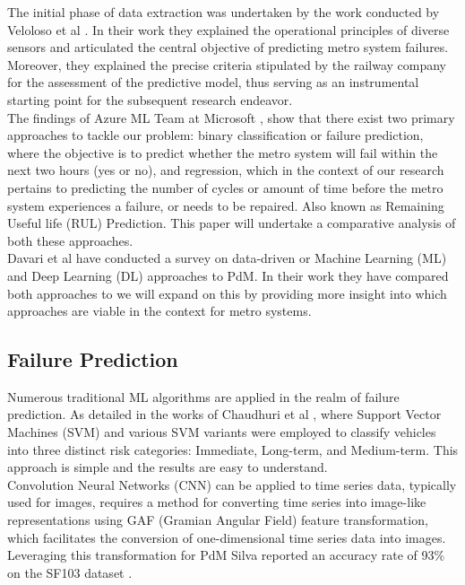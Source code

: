 \documentclass{article}
\begin{document}
The initial phase of data extraction was
undertaken by the work conducted by Veloloso et al \cite{Veloso2022}. In their work they explained the operational principles of diverse sensors
and articulated the central objective of predicting metro system failures. 
Moreover, they explained the precise criteria stipulated by the railway company for the assessment of the predictive model, thus serving as an instrumental starting point for the subsequent research endeavor. \\

The findings of Azure ML Team at Microsoft \cite{AzureML2015}, show that there exist two primary approaches to tackle our problem: binary classification or failure prediction, where the objective is to predict whether the metro system will fail within the next two hours (yes or no), and regression, which in the context of our research pertains to predicting the number of cycles or amount of time before the metro system experiences a failure, or needs to be repaired. Also known as Remaining Useful life (RUL) Prediction. This paper will undertake a comparative analysis of both these approaches. \\

Davari et al \cite{Davari2021} have conducted a survey on data-driven or Machine Learning (ML) and Deep Learning (DL) approaches to PdM. In their work they have compared both approaches to we will expand on this by providing more insight into which approaches are viable in the context for metro systems.

\subsection{Failure Prediction}

Numerous traditional ML algorithms are applied in the realm of failure prediction. As detailed in the works of Chaudhuri et al \cite{chaudhuri2018}, where Support Vector Machines (SVM) and various SVM variants were employed to classify vehicles into three distinct risk categories: Immediate, Long-term, and Medium-term. This approach is simple and the results are easy to understand. \\

Convolution Neural Networks (CNN) can be applied to time series data, typically used for
images, requires a method for converting time series into image-like representations using GAF (Gramian Angular Field) feature transformation, which facilitates the conversion of one-dimensional time series data into images. Leveraging this transformation for PdM Silva reported an accuracy rate of 93\% on the SF103 dataset \cite{Silva2019}. \\
\end{document}
